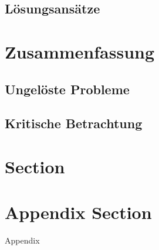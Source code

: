 \documentclass[a4paper, 12pt]{article}
\begin{document}
\subsection{Lösungsansätze}


\section{Zusammenfassung}
\subsection{Ungelöste Probleme}
\subsection{Kritische Betrachtung}


\section{Section}

\begingroup
\setlength{\emergencystretch}{.5em}
\printbibliography
\endgroup

\appendix
\section{Appendix Section}
Appendix
\end{document}
